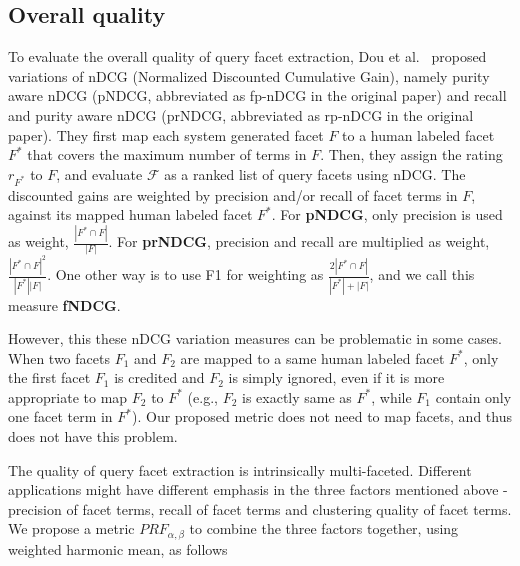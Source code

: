 \subsection{Overall quality}
\label{sec:evalmetricsall}
To evaluate the overall quality of query facet extraction, Dou et al.~\cite{dou2011finding} proposed variations of nDCG (Normalized Discounted Cumulative Gain), namely purity aware nDCG (pNDCG, abbreviated as fp-nDCG in the original paper) and recall and purity aware nDCG (prNDCG, abbreviated as rp-nDCG in the original paper). They first map each system generated facet $F$ to a human labeled facet $F^*$ that covers the maximum number of terms in $F$. Then, they assign the rating $r_{F^*}$ to $F$, and evaluate $\mathcal{F}$ as a ranked list of query facets using nDCG.
The discounted gains are weighted by precision and/or recall of facet terms in $F$, against its mapped human labeled facet $F^*$. For \textbf{pNDCG}, only precision is used as weight, $\frac{|F^* \cap F|}{|F|}$.
For \textbf{prNDCG}, precision and recall are multiplied as weight, $\frac{|F^* \cap F|^2}{|F^*||F|}$. One other way is to use F1 for weighting as $\frac{2|F^* \cap F|}{|F^*| + |F|}$, and we call this measure \textbf{fNDCG}.

However, this these nDCG variation measures can be problematic in some cases.
When two facets $F_1$ and $F_2$ are mapped to a same human labeled facet $F^*$, only the first facet $F_1$ is credited and $F_2$ is simply ignored, even if it is more appropriate to map $F_2$ to $F^*$ (e.g., $F_2$ is exactly same as $F^*$, while $F_1$ contain only one facet term in $F^*$). Our proposed metric does not need to map facets, and thus does not have this problem.

The quality of query facet extraction is intrinsically multi-faceted. Different applications might have different emphasis in the three factors mentioned above - precision of facet terms, recall of facet terms 
and clustering quality of facet terms. We propose a metric $PRF_{\alpha,\beta}$ to combine the three factors together, using weighted harmonic mean, as follows

